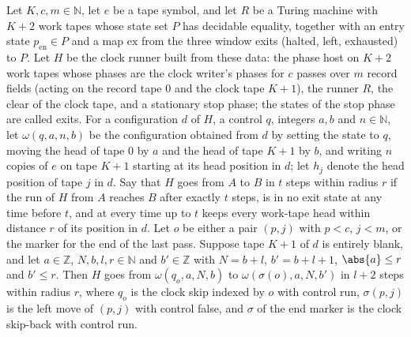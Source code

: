 \begin{lemma}
\label{Turing.cw_seg_skipC}
\leanok
{}
Let $K,c,m\in\mathbb{N}$, let $e$ be a tape symbol, and let $R$ be a Turing machine with $K+2$
work tapes whose state set $P$ has decidable equality, together with an entry state
$p_{\mathrm{en}}\in P$ and a map $\mathrm{ex}$ from the three window exits (halted, left,
exhausted) to $P$. Let $H$ be the clock runner built from these data: the phase host on $K+2$
work tapes whose phases are the clock writer's phases for $c$ passes over $m$ record fields
(acting on the record tape $0$ and the clock tape $K+1$), the runner $R$, the clear of the
clock tape, and a stationary stop phase; the states of the stop phase are called exits. For a
configuration $d$ of $H$, a control $q$, integers $a,b$ and $n\in\mathbb{N}$, let
$\omega(q,a,n,b)$ be the configuration obtained from $d$ by setting the state to $q$, moving
the head of tape $0$ by $a$ and the head of tape $K+1$ by $b$, and writing $n$ copies of $e$ on
tape $K+1$ starting at its head position in $d$; let $h_j$ denote the head position of tape $j$
in $d$. Say that $H$ goes from $A$ to $B$ in $t$ steps within radius $r$ if the run of $H$ from
$A$ reaches $B$ after exactly $t$ steps, is in no exit state at any time before $t$, and at
every time up to $t$ keeps every work-tape head within distance $r$ of its position in $d$. Let
$o$ be either a pair $(p,j)$ with $p<c$, $j<m$, or the marker for the end of the last pass.
Suppose tape $K+1$ of $d$ is entirely blank, and let $a\in\mathbb{Z}$, $N,b,l,r\in\mathbb{N}$
and $b'\in\mathbb{Z}$ with $N=b+l$, $b'=b+l+1$, $\abs{a}\le r$ and $b'\le r$. Then $H$ goes
from $\omega(q_o,a,N,b)$ to $\omega(\sigma(o),a,N,b')$ in $l+2$ steps within radius $r$, where
$q_o$ is the clock skip indexed by $o$ with control run, $\sigma(p,j)$ is the left move of
$(p,j)$ with control false, and $\sigma$ of the end marker is the clock skip-back with control
run.
\end{lemma}

